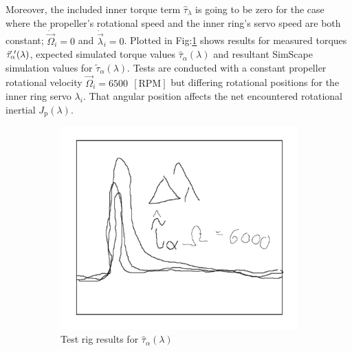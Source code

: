 Moreover, the included inner torque term $\hat{\tau}_\lambda$ is going to be zero for the case where the propeller's rotational speed and the inner ring's servo speed are both constant; $\dot{\vec{\Omega}}_i=0$ and $\dot{\vec{\lambda}}_i=0$. Plotted in Fig:\ref{fig:tau-alpha} shows results for measured torques $\vec{\tau}_\alpha\text{}\hspace{-2pt}'(\lambda)$, expected simulated torque values $\hat{\tau}_\alpha(\lambda)$ and resultant SimScape simulation values for $\tilde{\tau}_\alpha(\lambda)$. Tests are conducted with a constant propeller rotational velocity $\vec{\Omega}_i=6500~~[\text{RPM}]$ but differing rotational positions for the inner ring servo $\lambda_i$. That angular position affects the net encountered rotational inertial $J_\text{p}(\lambda)$.
\begin{figure}[htbp]
\centering
\begin{subfigure}{0.49\textwidth}
\centering
\includegraphics[width=\textwidth]{graphs/tau-alpha}
\caption{Test rig results for $\hat{\tau}_\alpha(\lambda)$}
\label{fig:tau-alpha}
\end{subfigure}
\begin{subfigure}{0.49\textwidth}
\centering

\end{subfigure}
\end{figure}
